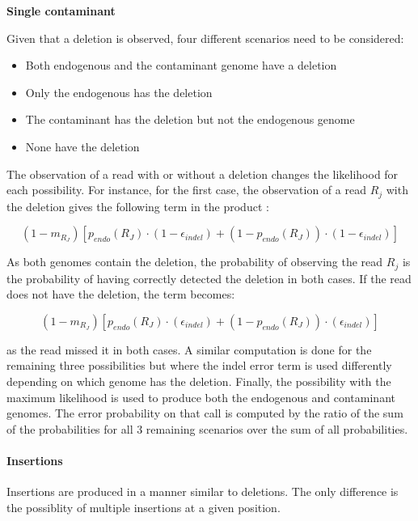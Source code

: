 \documentclass[a4paper,12pt]{article}
\begin{document}
{\bf Single contaminant}

Given that a deletion is observed, four different scenarios need to be considered:

\begin{itemize}
\item Both endogenous and the contaminant genome have a deletion
\item Only the endogenous has the deletion
\item The contaminant has the deletion but not the endogenous genome
\item None have the deletion
\end{itemize}

The observation of a read with or without a deletion changes the likelihood for each possibility. For instance, for the first case, the observation of a read $R_j$ with the deletion gives the following term in the product :

\begin{equation}
 (1-m_{R_J}) [  p_{endo}(R_J) \cdot (1-\epsilon_{indel})  +  (1-p_{endo}(R_J)) \cdot (1-\epsilon_{indel}) ] 
\label{eqn:bothcorrectdel}
\end{equation}

\noindent As both genomes contain the deletion, the probability of observing the read $R_j$ is the probability of having correctly detected the deletion in both cases. If the read does not have the deletion, the term becomes:

\begin{equation}
 (1-m_{R_J}) [  p_{endo}(R_J) \cdot (\epsilon_{indel})  +  (1-p_{endo}(R_J)) \cdot (\epsilon_{indel}) ] 
\label{eqn:bothincorrectdel}
\end{equation}

\noindent as the read missed it in both cases. A similar computation is done for the remaining three possibilities but where the indel error term is used differently depending on which genome has the deletion. Finally, the possibility with the maximum likelihood is used to produce both the endogenous and contaminant genomes. The error probability on that call is computed by the ratio of the sum of the probabilities for all 3 remaining scenarios over the sum of all probabilities. 


\paragraph{Insertions}

Insertions are produced in a manner similar to deletions. The only difference is the possiblity of multiple insertions at a given position. 
\end{document}
